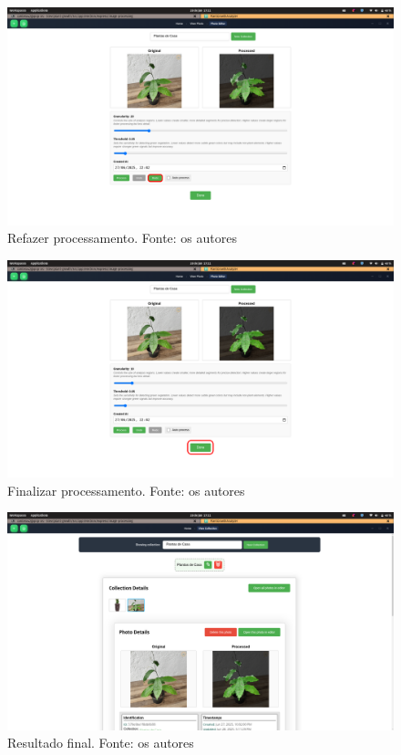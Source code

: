 \begin{figure}[H]
    \centering
    \includegraphics[width=1\textwidth]{../figures/screens/uc013/Screenshot from 2025-06-28 17-11-36.png}
    \caption{Refazer processamento. Fonte: os autores}
    \label{fig:uc013-screen6}
\end{figure}

\begin{figure}[H]
    \centering
    \includegraphics[width=1\textwidth]{../figures/screens/uc013/Screenshot from 2025-06-28 17-11-39.png}
    \caption{Finalizar processamento. Fonte: os autores}
    \label{fig:uc013-screen7}
\end{figure}

\begin{figure}[H]
    \centering
    \includegraphics[width=1\textwidth]{../figures/screens/uc013/Screenshot from 2025-06-28 17-11-46.png}
    \caption{Resultado final. Fonte: os autores}
    \label{fig:uc013-screen8}
\end{figure}

